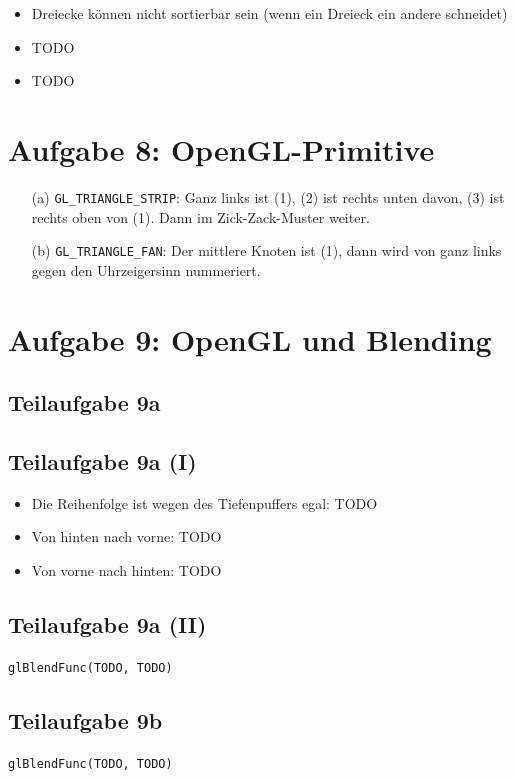 \documentclass[a4paper]{scrartcl}
\begin{document}
\begin{itemize}
    \item Dreiecke können nicht sortierbar sein (wenn ein Dreieck ein andere schneidet)
    \item TODO
    \item TODO
\end{itemize}

\section*{Aufgabe 8: OpenGL-Primitive}
\begin{itemize}
    \item[(a)] \texttt{GL\_TRIANGLE\_STRIP}: Ganz links ist (1), (2) ist rechts unten davon, (3) ist rechts oben von (1). Dann im Zick-Zack-Muster weiter.
    \item[(b)] \texttt{GL\_TRIANGLE\_FAN}: Der mittlere Knoten ist (1), dann wird von ganz links gegen den Uhrzeigersinn nummeriert.
\end{itemize}

\section*{Aufgabe 9: OpenGL und Blending}
\subsection*{Teilaufgabe 9a}
\subsection*{Teilaufgabe 9a (I)}
\begin{itemize}
    \item Die Reihenfolge ist wegen des Tiefenpuffers egal: TODO
    \item Von hinten nach vorne: TODO
    \item Von vorne nach hinten: TODO
\end{itemize}

\subsection*{Teilaufgabe 9a (II)}
\texttt{glBlendFunc(TODO, TODO)}

\subsection*{Teilaufgabe 9b}
\texttt{glBlendFunc(TODO, TODO)}
\end{document}
